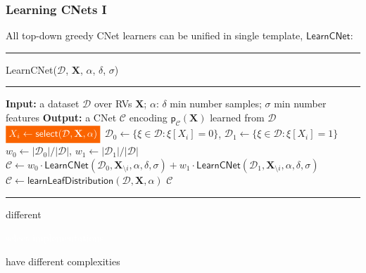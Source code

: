 \documentclass[xcolor={usenames,dvipsnames,svgnames}, compress]{beamer}
\newcommand{\highlight}[2][yellow]{\mathchoice%
  {\colorbox{#1}{\strut\textcolor{white}{$\displaystyle{#2}$}}}%
  {\colorbox{#1}{\strut\textcolor{white}{$\textstyle{#2}$}}}%
  {\colorbox{#1}{\strut\textcolor{white}{$\scriptstyle{#2}$}}}%
  {\colorbox{#1}{\strut\textcolor{white}{$\scriptscriptstyle{#2}$}}}}%
\newcommand{\highlighttext}[2][yellow]{{\colorbox{#1}{\strut\textcolor{white}{#2}}}}
\begin{document}
\begin{frame}[t]
  \frametitle{Learning CNets I}
  \small
      All top-down greedy CNet learners %
    can be unified in single template, $\mathsf{LearnCNet}$:
 \begin{center}  
  \begin{minipage}{0.9\linewidth}
    \vspace{10pt}
        \scriptsize
        {\hrule\flushleft\textsf{LearnCNet}($\mathcal{D}$, $\mathbf{X}$, $\alpha$,
        $\delta$, $\sigma$)\\\hrule}
  \begin{algorithmic}[1]
    \State \textbf{Input:} a dataset $\mathcal{D}$ over RVs $\mathbf{X}$; $\alpha$: $\delta$
    min number samples; $\sigma$ min number features
    \State  \textbf{Output:}  a CNet $\mathcal{C}$ encoding  $\mathsf{p}_{\mathcal{C}}(\textbf{X})$ learned from $\mathcal D$
    \State $\highlight[gold4]{X_i\leftarrow  \mathsf{select}(\mathcal D, \mathbf X, \alpha)}$
    \State $\mathcal D_0 \leftarrow \{\xi \in \mathcal D: \xi[X_i]=0 \}$, $\mathcal D_1 \leftarrow \{\xi \in \mathcal D: \xi[X_i]=1 \}$
    \State $w_0 \leftarrow |\mathcal D_0| / |\mathcal D|$, $w_1 \leftarrow |\mathcal   D_1| / |\mathcal D|$
    \State $\mathcal{C} \leftarrow
    w_0\cdot\mathsf{LearnCNet}(\mathcal D_0, \mathbf X_{\setminus i},
    \alpha, \delta, \sigma) + w_1 \cdot\mathsf{LearnCNet}(\mathcal D_1, \mathbf X_{\setminus i}, \alpha, \delta, \sigma) $
    \Else 
    \State $\mathcal{C} \leftarrow \mathsf{learnLeafDistribution}(\mathcal D, \mathbf X, \alpha)$
    \EndIf
    \State \Return $\mathcal{C}$
  \end{algorithmic}
  \hrule

  different \highlighttext[gold2]{\textsf{select} implementations}
    have different complexities
\end{minipage}
\end{center}
\end{frame}
\end{document}
